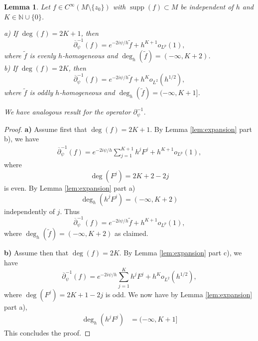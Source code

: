 \documentclass[12pt]{amsart}
\def\p{\partial}
\DeclareMathOperator{\supp}{supp}
\def\N{\mathbb N}
\newtheorem{lemma}[theorem]{Lemma}
\theoremstyle{definition}
\theoremstyle{remark}
\newcommand{\abs}[1]{\lvert #1 \rvert}
\newcommand{\op}{\overline \p}
\begin{document}
 
 \begin{lemma}\label{lem:expansion2}
 Let $f\in C^\infty(M\setminus \{z_0\})$ with $\supp(f)\subset M$ be independent of $h$ and $K\in \N\cup \{0\}$.
 
 \noindent a) If $\deg(f)=2K+1$, then 
 \[
  \op_\psi^{-1}(f)=e^{-2i\psi/h}\tilde f+ h^{K+1}o_{L^p}(1),
 \]
where $\tilde f$ is evenly $h$-homogeneous and $ \deg_h(\tilde f)=(-\infty, K+2)$.\\
\noindent b) If $\deg(f)=2K$, then
\[
  \op_\psi^{-1}(f)=e^{-2i\psi/h}\tilde f+ h^{K}o_{L^2}(h^{1/2}), %
 \]
 where $\tilde f$ is oddly $h$-homogeneous and $\deg_h(\tilde f) =(-\infty, K+1]$.

We have analogous result for the operator $\p_\psi^{-1}$. 
\end{lemma}
\begin{proof}
\textbf{a)} Assume first that $\deg(f)=2K+1$. 
 By Lemma \ref{lem:expansion} part b), we have
 \begin{align}
  \op_{\psi}^{-1}(f)=e^{-2i\psi/h}\sum_{j=1}^{K+1}h^j F^j+ h^{K+1}o_{L^p}(1),
 \end{align}
 where 
 \[
  \deg(F^j)=2K+2-2j
 \]
 is even. By {\color{black} Lemma \ref{lem:expansion} part a)}
\[
 \deg_h(h^jF^j)=(-\infty, K+2 )
\]
independently of $j$.
Thus
\[
 \op_{\psi}^{-1}(f)=e^{-2i\psi/h}\tilde f + h^{K+1}o_{L^p}(1),
\]
where $\deg_h(\tilde f) =(-\infty, K+2)$ as claimed.

\textbf{b)} Assume then that $\deg(f)=2K$. By Lemma \ref{lem:expansion} part c), we have
\[
 \op_{\psi}^{-1}(f)=e^{-2i\psi/h}\sum_{j=1}^{K}h^j F^j+ h^K o_{L^2}(h^{1/2}),
\]
where $\deg(F^j) = 2K +1 -2j$ is odd. We now have by Lemma \ref{lem:expansion} part a),
\begin{align*}
 \deg_h(h^jF^j)&=(-\infty, K+1]%
\end{align*}
 This concludes the proof.
\end{proof}
\end{document}
